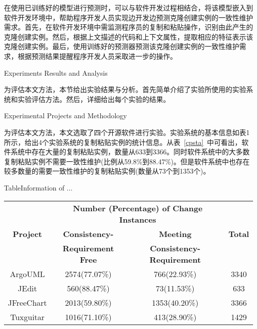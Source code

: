 在使用已训练好的模型进行预测时，可以与软件开发过程相结合，将该模型嵌入到软件开发环境中，帮助程序开发人员实现边开发边预测克隆创建实例的一致性维护需求。首先，在软件开发环境中需监测程序员的复制和粘贴操作，识别由此产生的克隆创建实例。然后，根据上文描述的代码和上下文属性，提取相应的特征表示该克隆创建实例。最后，使用训练好的预测器预测该克隆创建实例的一致性维护需求，根据预测结果提醒程序开发人员采取进一步的操作。

{Experiments Results and Analysis}

为评估本文方法，本节给出实验结果与分析。首先简单介绍了实验所使用的实验系统和实验评估方法。然后，详细给出每个实验的结果。

{Experimental Projects and Methodology}

为评估本文方法，本文选取了四个开源软件进行实验。实验系统的基本信息如表1所示，给出4个实验系统的复制粘贴实例的统计信息。从表~\ref{cpsta}~中可看出，软件系统中存在大量的复制粘贴实例，数量从633到3366。同时软件系统中的大多数复制粘贴实例不需要一致性维护(比例从59.8\%到88.47\%)。但是软件系统中也存在较多数量的需要一致性维护的复制粘贴实例(数量从73个到1353个)。

\begin{table}[htbp]
{Table$\!$}{Information of ...}
\vspace{0.5em}
\centering
\wuhao
\begin{tabular}{cccc}
\toprule[1.5pt]
\multirow{3}{*}{\textbf{Project}}& \multicolumn{2}{c}{\textbf{Number (Percentage) of Change Instances}} & \multirow{3}{*}{\textbf{Total}}\\
\cline{2-3}
&\textbf{Consistency-} &\textbf{Meeting} &  \\
&\textbf{Requirement Free}&\textbf{Consistency-Requirement}& \\
\midrule[1pt]
ArgoUML&	2574(77.07\%)&	766(22.93\%)&	3340\\
JEdit&	560(88.47\%)&	73(11.53\%)&	633\\
JFreeChart&	2013(59.80\%)&	1353(40.20\%)&	3366\\
Tuxguitar&	1016(71.10\%)&	413(28.90\%)&	1429\\
\bottomrule[1.5pt]
\end{tabular}
\end{table}


